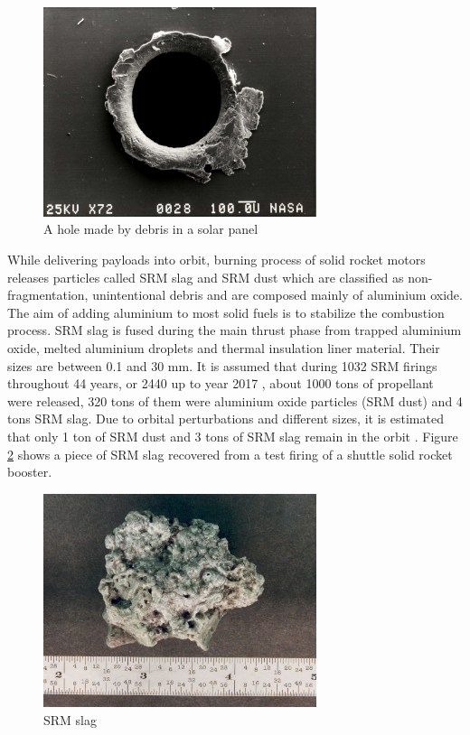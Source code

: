 \begin{figure}[H]
\centering
  \includegraphics[width=8cm]{images/hypervelocitycollision}
  \caption{A hole made by debris in a solar panel}
  \label{fig:hypervelocitycollision}
\end{figure}	
	
	While delivering payloads into orbit, burning process of solid rocket motors releases particles called SRM slag and SRM dust which are classified as non-fragmentation, unintentional debris and are composed mainly of aluminium oxide. The aim of adding aluminium to most solid fuels is to stabilize the combustion process. SRM slag is fused during the main thrust phase from trapped aluminium oxide, melted aluminium droplets and thermal insulation liner material. Their sizes are between 0.1 and 30 mm. It is assumed that during 1032 SRM firings throughout 44 years, or 2440 up to year 2017 \citep{esabr336}, about 1000 tons of propellant were released, 320 tons of them were aluminium oxide particles (SRM dust) and 4 tons SRM slag. Due to orbital perturbations and different sizes, it is estimated that only 1 ton of SRM dust and 3 tons of SRM slag remain in the orbit \citep{klinkrad2006space}. Figure \ref{fig:srmslag} shows a piece of SRM slag recovered from a test firing of a shuttle solid rocket booster.
	
\begin{figure}[H]
\centering
  \includegraphics[width=8cm]{images/slag}
  \caption{SRM slag}
  \label{fig:srmslag}
\end{figure}	
	

